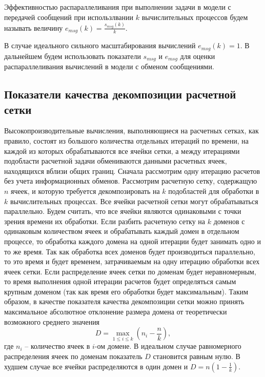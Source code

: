 \begin{definition}
Эффективностью распараллеливания при выполнении задачи в модели с передачей сообщений\label{term:msg_eff} при использлвании $k$ вычислительных процессов будем называть величину $e_{msg}(k) = \frac{s_{msg}(k)}{k}$.
\end{definition}

В случае идеального сильного масштабирования вычислений $e_{msg}(k) = 1$.
В дальнейшем будем использовать показатели $s_{msg}$ и $e_{msg}$ для оценки распараллеливания вычислений в модели с обменом сообщениями.


\subsection{Показатели качества декомпозиции расчетной сетки}

Высокопроизводительные вычисления, выполняющиеся на расчетных сетках, как правило, состоят из большого количества отдельных итераций по времени, на каждой из которых обрабатываются все ячейки сетки, а между итерациями подобласти расчетной задачи обмениваются данными расчетных ячеек, находящихся вблизи общих границ.
Сначала рассмотрим одну итерацию расчетов без учета информационных обменов.
Рассмотрим расчетную сетку, содержащую $n$ ячеек, и которую требуется декомпозировать на $k$ подобластей для обработки в $k$ вычислительных процессах.
Все ячейки расчетной сетки могут обрабатываться параллельно.
Будем считать, что все ячейки являются одинаковыми с точки зрения времени их обработки.
Если разбить расчетную сетку на $k$ доменов с одинаковым количеством ячеек и обрабатывать каждый домен в отдельном процессе, то обработка каждого домена на одной итерации будет занимать одно и то же время.
Так как обработка всех доменов будет производиться параллельно, то это время и будет временем, затрачиваемым на одну итерацию обработки всех ячеек сетки.
Если распределение ячеек сетки по доменам будет неравномерным, то время выполнения одной итерации расчетов будет определяться самым крупным доменом (так как время его обработки будет максимальным).
Таким образом, в качестве показателя качества декомпозиции сетки можно принять максимальное абсолютное отклонение размера домена от теоретически возможного среднего значения
\begin{equation}
	D = \max_{1 \le i \le k}{ \left( n_i - \frac{n}{k} \right) },
\end{equation}
где $n_i$ – количество ячеек в $i$-ом домене.
В идеальном случае равномерного распределения ячеек по доменам показатель $D$ становится равным нулю.
В худшем случае все ячейки распределяются в один домен и $D = n \left( 1 - \frac{1}{k} \right)$.


